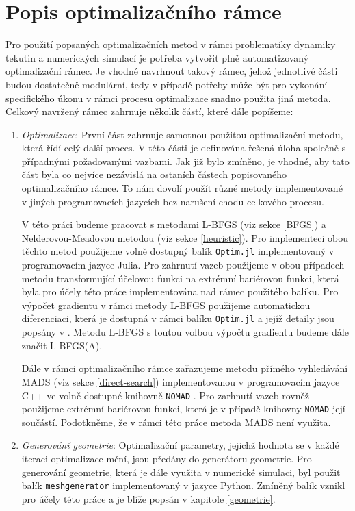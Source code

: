 \section{Popis optimalizačního rámce}\label{ramec}
Pro použití popsaných optimalizačních metod v rámci problematiky dynamiky tekutin a numerických simulací je potřeba vytvořit plně automatizovaný optimalizační rámec. Je vhodné navrhnout takový rámec, jehož jednotlivé části budou dostatečně modulární, tedy v případě potřeby může být pro vykonání specifického úkonu v rámci procesu optimalizace snadno použita jiná metoda. Celkový navržený rámec zahrnuje několik částí, které dále popíšeme:

\begin{enumerate}
	\item \textit{Optimalizace}: První část zahrnuje samotnou použitou optimalizační metodu, která řídí celý další proces. V této části je definována řešená úloha společně s případnými požadovanými vazbami. Jak již bylo zmíněno, je vhodné, aby tato část byla co nejvíce nezávislá na ostaních částech popisovaného optimalizačního rámce. To nám dovolí použít různé metody implementované v jiných programovacích jazycích bez narušení chodu celkového procesu.
	
	V této práci budeme pracovat s metodami L-BFGS (viz sekce \ref{BFGS}) a Nelderovou-Meadovou metodou (viz sekce \ref{heuristic}). Pro implementeci obou těchto metod použijeme volně dostupný balík \texttt{Optim.jl} \cite{Optim.jl} implementovaný v programovacím jazyce Julia. Pro zahrnutí vazeb použijeme v obou případech metodu transformující účelovou funkci na extrémní bariérovou funkci, která byla pro účely této práce implementována nad rámec použitého balíku. Pro výpočet gradientu v rámci metody L-BFGS použijeme automatickou diferenciaci, která je dostupná v rámci balíku \texttt{Optim.jl} a jejíž detaily jsou popsány v \cite{Optim.jl}. Metodu L-BFGS s toutou volbou výpočtu gradientu budeme dále značit L-BFGS(A).
	
	Dále v rámci optimalizačního rámce zařazujeme metodu přímého vyhledávání MADS (viz sekce \ref{direct-search}) implementovanou v programovacím jazyce C++ ve volně dostupné knihovně \texttt{NOMAD} \cite{nomad}. Pro zarhnutí vazeb rovněž použijeme extrémní bariérovou funkci, která je v případě knihovny \texttt{NOMAD} její součástí. Podotkněme, že v rámci této práce metoda MADS není využita.
	
	\item \textit{Generování geometrie}: Optimalizační parametry, jejichž hodnota se v každé iteraci optimalizace mění, jsou předány do generátoru geometrie. Pro generování geometrie, která je dále využita v numerické simulaci, byl použit balík \texttt{meshgenerator} implementovaný v jazyce Python. Zmíněný balík vznikl pro účely této práce a je blíže popsán v kapitole \ref{geometrie}.
	

\end{enumerate}
